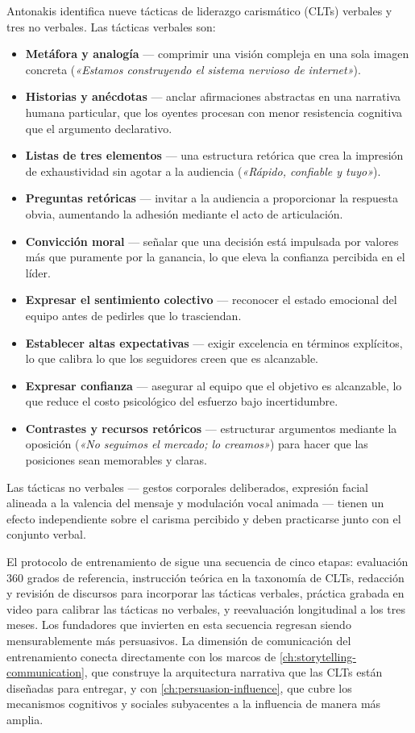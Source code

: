 Antonakis identifica nueve tácticas de liderazgo carismático (CLTs) verbales y tres no verbales.
Las tácticas verbales son:
\begin{itemize}
  \item \textbf{Metáfora y analogía} --- comprimir una visión compleja en una sola imagen concreta
    (\emph{«Estamos construyendo el sistema nervioso de internet»}).
  \item \textbf{Historias y anécdotas} --- anclar afirmaciones abstractas en una narrativa humana
    particular, que los oyentes procesan con menor resistencia cognitiva que el argumento
    declarativo.
  \item \textbf{Listas de tres elementos} --- una estructura retórica que crea la impresión de
    exhaustividad sin agotar a la audiencia (\emph{«Rápido, confiable y tuyo»}).
  \item \textbf{Preguntas retóricas} --- invitar a la audiencia a proporcionar la respuesta
    obvia, aumentando la adhesión mediante el acto de articulación.
  \item \textbf{Convicción moral} --- señalar que una decisión está impulsada por valores más que
    puramente por la ganancia, lo que eleva la confianza percibida en el líder.
  \item \textbf{Expresar el sentimiento colectivo} --- reconocer el estado emocional del equipo
    antes de pedirles que lo trasciendan.
  \item \textbf{Establecer altas expectativas} --- exigir excelencia en términos explícitos, lo
    que calibra lo que los seguidores creen que es alcanzable.
  \item \textbf{Expresar confianza} --- asegurar al equipo que el objetivo es alcanzable, lo que
    reduce el costo psicológico del esfuerzo bajo incertidumbre.
  \item \textbf{Contrastes y recursos retóricos} --- estructurar argumentos mediante la oposición
    (\emph{«No seguimos el mercado; lo creamos»}) para hacer que las posiciones sean memorables y
    claras.
\end{itemize}
Las tácticas no verbales --- gestos corporales deliberados, expresión facial alineada a la
valencia del mensaje y modulación vocal animada --- tienen un efecto independiente sobre el
carisma percibido y deben practicarse junto con el conjunto verbal.

El protocolo de entrenamiento de \textcite{antonakis2011charisma} sigue una secuencia de cinco
etapas: evaluación 360 grados de referencia, instrucción teórica en la taxonomía de CLTs,
redacción y revisión de discursos para incorporar las tácticas verbales, práctica grabada en
video para calibrar las tácticas no verbales, y reevaluación longitudinal a los tres meses. Los
fundadores que invierten en esta secuencia regresan siendo mensurablemente más persuasivos. La
dimensión de comunicación del entrenamiento conecta directamente con los marcos de
\cref{ch:storytelling-communication}, que construye la arquitectura narrativa que las CLTs están
diseñadas para entregar, y con \cref{ch:persuasion-influence}, que cubre los mecanismos
cognitivos y sociales subyacentes a la influencia de manera más amplia.

